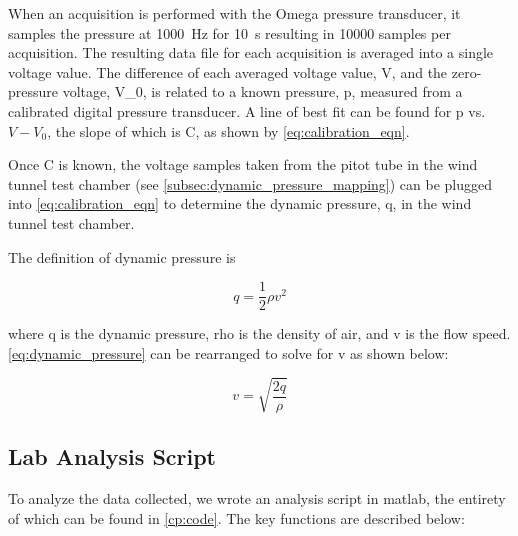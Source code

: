 When an acquisition is performed with the Omega pressure transducer, it samples the pressure at \qty{1000}{\hertz} for \qty{10}{\second} resulting in \num{10000} samples per acquisition. The resulting data file for each acquisition is averaged into a single voltage value. The difference of each averaged voltage value, \gls{V}, and the zero-pressure voltage, \gls{V_0}, is related to a known pressure, \gls{p}, measured from a calibrated digital pressure transducer. A line of best fit can be found for \gls{p} vs. $V - V_0$, the slope of which is \gls{C}, as shown by \autoref{eq:calibration_eqn}.

Once \gls{C} is known, the voltage samples taken from the pitot tube in the wind tunnel test chamber (see \autoref{subsec:dynamic_pressure_mapping}) can be plugged into \autoref{eq:calibration_eqn} to determine the dynamic pressure, \gls{q}, in the wind tunnel test chamber.

The definition of dynamic pressure is

\begin{equation}\label{eq:dynamic_pressure}
    q = \frac{1}{2}\rho v^2
\end{equation}

\noindent{}where \gls{q} is the dynamic pressure, \gls{rho} is the density of air, and \gls{v} is the flow speed. \autoref{eq:dynamic_pressure} can be rearranged to solve for \gls{v} as shown below:

\begin{equation}\label{eq:velocity}
    v = \sqrt{\frac{2q}{\rho}}
\end{equation}

\subsection{Lab Analysis Script}\label{subsec:analysis_script}

To analyze the data collected, we wrote an analysis script in \acrfull{matlab}, the entirety of which can be found in \autoref{cp:code}. The key functions are described below:

